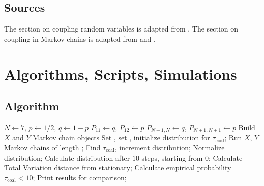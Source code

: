 \documentclass[12pt]{article}
\begin{document}
\subsection*{Sources} The section on coupling random variables is
adapted from
\cite{thorisson_2000}.  The section on coupling in Markov chains is
adapted from
\cite{levin09} and
\cite{thorisson_2000}.


\hr

\section*{Algorithms, Scripts, Simulations}

\subsection*{Algorithm}
\begin{algorithm}[H]
  \DontPrintSemicolon

  \BlankLine
  $ N \leftarrow 7 $, $ p \leftarrow 1/2 $,
  $ q \leftarrow 1-p $\;
  $ P_{11} \leftarrow q $, $ P_{12} \leftarrow p $\;
  $ P_{N+1,N} \leftarrow q $, $ P_{N+1, N+1} \leftarrow p $\;
  Build $ X $ and $ Y $ Markov chain objects\;
  \BlankLine
  Set \pL, set \nT, initialize distribution for $\tau_{\text{coal}}$;
   {
    Run $ X $, $ Y $ Markov chains of length \pL;
    Find $ \tau_{\text{coal}} $, increment distribution;
  }
  Normalize distribution;
  Calculate distribution after $ 10 $ steps, starting from $ 0 $;
  Calculate Total Variation distance from stationary;
  Calculate empirical probability $ \tau_{\text{coal}} < 10 $;
  Print results for comparison;
\end{algorithm}
\end{document}
